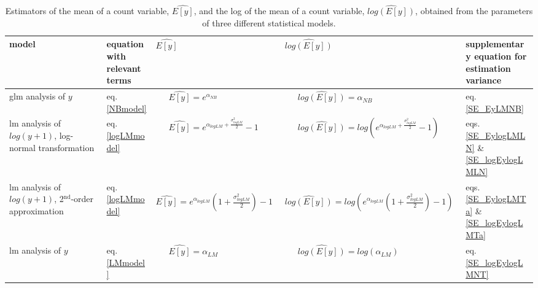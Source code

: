 \documentclass[]{article}
\begin{document}
\begin{landscape}

\begin{table}
\begin{center}
\caption{Estimators of the mean of a count variable, $\widehat{E[y]}$, and the log of the mean of a count variable, $\widehat{log(E[y])}$, obtained from the parameters of three different statistical models.}
\label{EstimatorsTable}
\vspace{2mm}
\begin{tabular}{p{2.8cm} p{2.2cm} l l p{2.8cm}}
\hline
\hline
model  & equation with relevant terms    & $\widehat{E[y]}$  & $\widehat{log(E[y])}$ & supplementary equation for estimation variance \\
\hline

  glm analysis of $y$  
& eq. \ref{NBmodel} 
& {equation}\label{EyNB}\thetag{\theequation}~~~$\widehat{E[y]}=e^{\alpha_{NB}}$ 
& {equation}\label{logEyNB}\thetag{\theequation}~~~$\widehat{log(E[y])}=\alpha_{NB}$ 
& eq. \ref{SE_EyLMNB} \\

  lm analysis of $log(y+1)$, log-normal transformation 
& eq. \ref{logLMmodel} 
& {equation}\label{EylogLMLN}\thetag{\theequation}~~~$\widehat{E[y]}=e^{\alpha_{logLM}+\frac{\sigma^2_{logLM}}{2}}-1$ 
& {equation}\label{logEylogLMLN}\thetag{\theequation}~~~$\widehat{log(E[y])}=log(e^{\alpha_{logLM}+\frac{\sigma^2_{logLM}}{2}}-1)$ 
& eqs. \ref{SE_EylogLMLN} \& \ref{SE_logEylogLMLN}  \\

  lm analysis of $log(y+1)$, 2$^{\text{nd}}$-order approximation 
& eq. \ref{logLMmodel} 
& {equation}\label{EylogLMTa}\thetag{\theequation}~~~$\widehat{E[y]}=e^{\alpha_{logLM}}(1+\frac{\sigma^2_{logLM}}{2})-1$ 
& {equation}\label{logEylogLMTa}\thetag{\theequation}~~~$\widehat{log(E[y])}=log(e^{\alpha_{logLM}}(1+\frac{\sigma^2_{logLM}}{2})-1)$ 
& eqs. \ref{SE_EylogLMTa} \& \ref{SE_logEylogLMTa} \\

  lm analysis of $y$  
& eq. \ref{LMmodel} 
& {equation}\label{EyLM}\thetag{\theequation}~~~$\widehat{E[y]}=\alpha_{LM}$ 
& {equation}\label{logEyLM}\thetag{\theequation}~~~$\widehat{log(E[y])}=log(\alpha_{LM})$ 
& eq. \ref{SE_logEylogLMNT} \\

\hline
\hline
\end{tabular}
\end{center}
\end{table}

\end{landscape}
\end{document}
